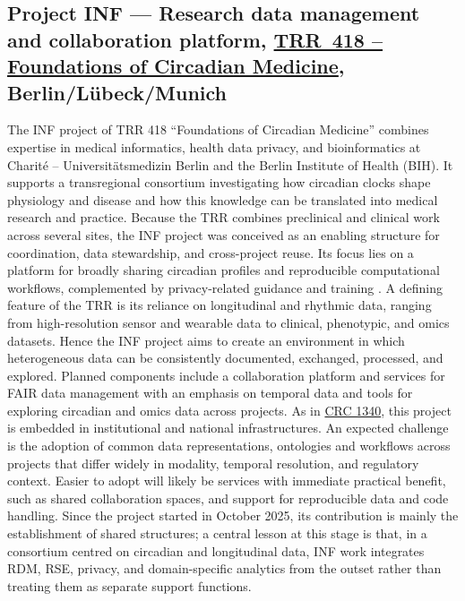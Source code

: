 \documentclass{eceasst}
\begin{document}
\subsection{Project INF --- Research data management and collaboration platform, \href{https://gepris.dfg.de/gepris/projekt/541063275?language=en}{TRR~418 -- Foundations of Circadian Medicine}, Berlin/Lübeck/Munich}
The INF project of TRR 418 “Foundations of Circadian Medicine” combines expertise in medical informatics, health data privacy, and bioinformatics at Charité – Universitätsmedizin Berlin and the Berlin Institute of Health (BIH).
It supports a transregional consortium investigating how circadian clocks shape physiology and disease and how this knowledge can be translated into medical research and practice. Because the TRR combines preclinical and clinical work across several sites, the INF project was conceived as an enabling structure for coordination, data stewardship, and cross-project reuse. Its focus lies on a platform for broadly sharing circadian profiles and reproducible computational workflows, complemented by privacy-related guidance and training \cite{baum_data_circadian_2023}.
A defining feature of the TRR is its reliance on longitudinal and rhythmic data, ranging from high-resolution sensor and wearable data to clinical, phenotypic, and omics datasets.
Hence the INF project aims to create an environment in which heterogeneous data can be consistently documented, exchanged, processed, and explored.
Planned components include a collaboration platform and services for FAIR data management with an emphasis on temporal data and tools for exploring circadian and omics data across projects.
As in \hyperref[sec:sfb1340]{CRC 1340}, this project is embedded in institutional and national infrastructures.
An expected challenge is the adoption of common data representations, ontologies and workflows across projects that differ widely in modality, temporal resolution, and regulatory context.
Easier to adopt will likely be services with immediate practical benefit, such as shared collaboration spaces, and support for reproducible data and code handling.
Since the project started in October 2025, its contribution is mainly the establishment of shared structures; a central lesson at this stage is that, in a consortium centred on circadian and longitudinal data, INF work integrates RDM, RSE, privacy, and domain-specific analytics from the outset rather than treating them as separate support functions.
\end{document}
